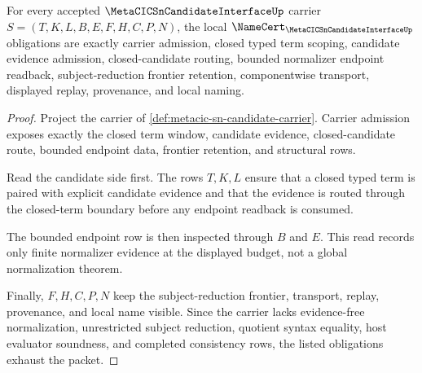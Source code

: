 \begin{theorem}
\label{thm:metacic-sn-candidate-namecert-obligations}
For every accepted $\MetaCICSnCandidateInterfaceUp$ carrier $S=(T,K,L,B,E,F,H,C,P,N)$, the local $\NameCert_{\MetaCICSnCandidateInterfaceUp}$ obligations are exactly carrier admission, closed typed term scoping, candidate evidence admission, closed-candidate routing, bounded normalizer endpoint readback, subject-reduction frontier retention, componentwise transport, displayed replay, provenance, and local naming.
\end{theorem}
\begin{proof}
Project the carrier of \autoref{def:metacic-sn-candidate-carrier}. Carrier admission exposes exactly the closed term window, candidate evidence, closed-candidate route, bounded endpoint data, frontier retention, and structural rows.

Read the candidate side first. The rows $T,K,L$ ensure that a closed typed term is paired with explicit candidate evidence and that the evidence is routed through the closed-term boundary before any endpoint readback is consumed.

The bounded endpoint row is then inspected through $B$ and $E$. This read records only finite normalizer evidence at the displayed budget, not a global normalization theorem.

Finally, $F,H,C,P,N$ keep the subject-reduction frontier, transport, replay, provenance, and local name visible. Since the carrier lacks evidence-free normalization, unrestricted subject reduction, quotient syntax equality, host evaluator soundness, and completed consistency rows, the listed obligations exhaust the packet.
\end{proof}

